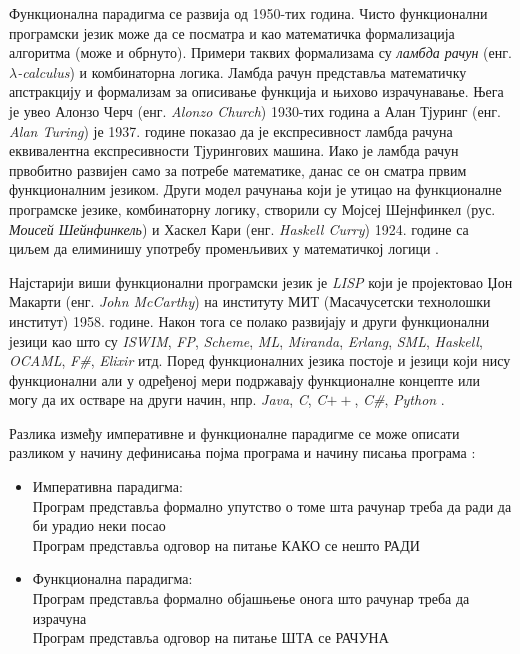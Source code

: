 \documentclass[12pt,oneside]{memoir}
\begin{document}
Функционална парадигма се развија од 1950-тих година. Чисто функционални програмски језик може да се
посматра и као математичка формализација алгоритма (може и обрнуто). Примери таквих формализама су \textit{ламбда рачун} (енг. \textit{$\lambda$-calculus}) и комбинаторна логика. Ламбда рачун представља математичку апстракцију и формализам за описивање функција и њихово израчунавање. Њега је увео Алонзо Черч (енг. \textit{Alonzo Church}) 1930-тих година а Алан Тјуринг (енг. \textit{Alan Turing}) је 1937. године показао да је експресивност ламбда рачуна еквивалентна експресивности Тјурингових машина. Иако је ламбда рачун првобитно развијен само за потребе математике, данас се он сматра првим функционалним језиком. Други модел рачунања који је утицао на функционалне програмске језике, комбинаторну логику, створили су Мојсеј Шејнфинкел (рус. \textit{Моисей Шейнфинкель}) и Хаскел Кари (енг. \textit{Haskell Curry}) 1924. године са циљем да елиминишу употребу променљивих у математичкој логици \cite{funkMilena, funkMalkov, lambdaRacun, history}.
\par Најстарији виши функционални програмски језик је \textit{LISP} који је пројектовао Џон Макарти (енг. \textit{John McCarthy}) на институту МИТ (Масачусетски технолошки институт) 1958. године. Након тога се полако развијају и други функционални језици као што су \textit{ISWIM}, \textit{FP}, \textit{Scheme}, \textit{ML}, \textit{Miranda}, \textit{Erlang}, \textit{SML}, \textit{Haskell}, \textit{OCAML}, \textit{ F\#}, \textit{Elixir} итд. Поред функционалних језика постоје и језици који нису функционални али  у одређеној мери подржавају функционалне концепте или могу да их остваре на други начин, нпр. \textit{Java}, \textit{C}, \textit{C$++$}, \textit{C\#}, \textit{Python} \cite{funkMilena, history}.
\par Разлика између императивне и функционалне парадигме се може описати разликом у начину дефинисања појма програма и начину писања програма \cite{funkMalkov}:
\begin{itemize}
\item Императивна парадигма: 
\\Програм представља формално упутство о томе шта рачунар треба да ради да би урадио неки посао
\\Програм представља одговор на питање КАКО се нешто РАДИ
\item Функционална парадигма:
\\Програм представља формално објашњење онога што рачунар треба да израчуна
\\Програм представља одговор на питање ШТА се РАЧУНА
\end{itemize}
\end{document}
